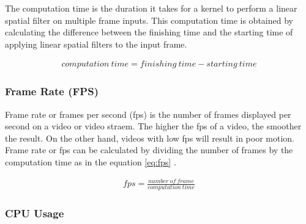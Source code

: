 The computation time is the duration it takes for a kernel to perform a linear spatial filter on multiple frame inputs. This computation time is obtained by calculating the difference between the finishing time and the starting time of applying linear spatial filters to the input frame.

\begin{equation}
    \label{eq:time}
    \begin{split}
computation\ time = finishing\ time - starting\ time
    \end{split}
\end{equation}

\subsubsection{Frame Rate (FPS)}

Frame rate or frames per second (fps) is the number of frames displayed per second on a video or video straem. The higher the fps of a video, the smoother the result. On the other hand, videos with low fps will result in poor motion. Frame rate or fps can be calculated by dividing the number of frames by the computation time as in the equation \ref{eq:fps} \cite{pdf:pavan}.

\begin{equation}
    \label{eq:fps}
    \begin{split}
fps = \frac{number\ of\ frame}{computation\ time}
    \end{split}
\end{equation}

\subsubsection{CPU Usage}


